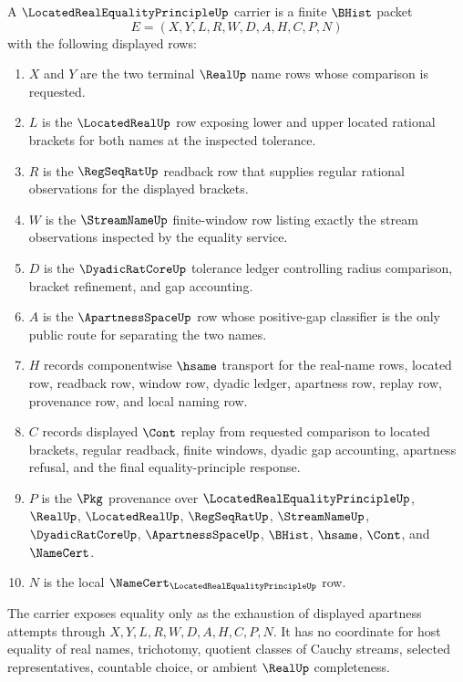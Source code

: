 \begin{definition}
\label{def:located-real-equality-principle-packet}
A $\LocatedRealEqualityPrincipleUp$ carrier is a finite $\BHist$ packet
$$
E=(X,Y,L,R,W,D,A,H,C,P,N)
$$
with the following displayed rows:
\begin{enumerate}
\item $X$ and $Y$ are the two terminal $\RealUp$ name rows whose comparison is requested.
\item $L$ is the $\LocatedRealUp$ row exposing lower and upper located rational brackets for both names at the inspected tolerance.
\item $R$ is the $\RegSeqRatUp$ readback row that supplies regular rational observations for the displayed brackets.
\item $W$ is the $\StreamNameUp$ finite-window row listing exactly the stream observations inspected by the equality service.
\item $D$ is the $\DyadicRatCoreUp$ tolerance ledger controlling radius comparison, bracket refinement, and gap accounting.
\item $A$ is the $\ApartnessSpaceUp$ row whose positive-gap classifier is the only public route for separating the two names.
\item $H$ records componentwise $\hsame$ transport for the real-name rows, located row, readback row, window row, dyadic ledger, apartness row, replay row, provenance row, and local naming row.
\item $C$ records displayed $\Cont$ replay from requested comparison to located brackets, regular readback, finite windows, dyadic gap accounting, apartness refusal, and the final equality-principle response.
\item $P$ is the $\Pkg$ provenance over $\LocatedRealEqualityPrincipleUp$, $\RealUp$, $\LocatedRealUp$, $\RegSeqRatUp$, $\StreamNameUp$, $\DyadicRatCoreUp$, $\ApartnessSpaceUp$, $\BHist$, $\hsame$, $\Cont$, and $\NameCert$.
\item $N$ is the local $\NameCert_{\LocatedRealEqualityPrincipleUp}$ row.
\end{enumerate}
The carrier exposes equality only as the exhaustion of displayed apartness attempts through $X,Y,L,R,W,D,A,H,C,P,N$. It has no coordinate for host equality of real names, trichotomy, quotient classes of Cauchy streams, selected representatives, countable choice, or ambient $\RealUp$ completeness.
\end{definition}

